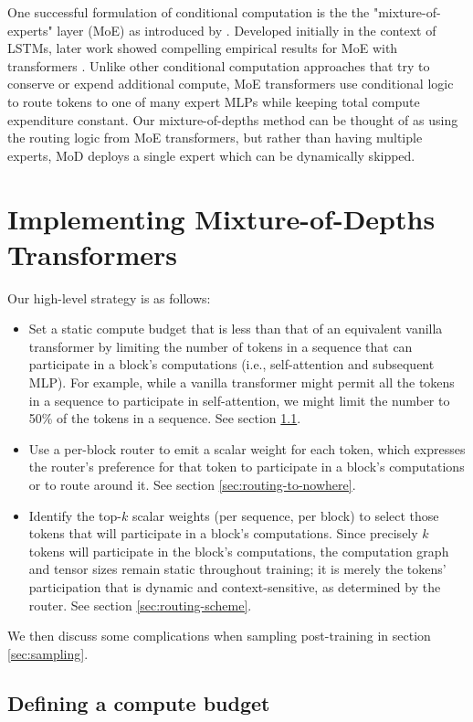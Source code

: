 \documentclass[11pt, a4paper, onecolumn, logo, copyright]{googledeepmind}
\begin{document}
One successful formulation of conditional computation is the the "mixture-of-experts" layer (MoE) as introduced by \citet{shazeer2017outrageously}. Developed initially in the context of LSTMs, later work showed compelling empirical results for MoE with transformers \citep{lepikhin2020gshard, fedus2022switch, zoph2022stmoe}. Unlike other conditional computation approaches that try to conserve or expend additional compute, MoE transformers use conditional logic to route tokens to one of many expert MLPs while keeping total compute expenditure constant. Our mixture-of-depths method can be thought of as using the routing logic from MoE transformers, but rather than having multiple experts, MoD deploys a single expert which can be dynamically skipped. 

\section{Implementing Mixture-of-Depths Transformers}
Our high-level strategy is as follows:
\begin{itemize}
    \item Set a static compute budget that is less than that of an equivalent vanilla transformer by limiting the number of tokens in a sequence that can participate in a block's computations (i.e., self-attention and subsequent MLP). For example, while a vanilla transformer might permit all the tokens in a sequence to participate in self-attention, we might limit the number to 50\% of the tokens in a sequence. See section \ref{sec:define-compute-budget}.
    \item Use a per-block router to emit a scalar weight for each token, which expresses the router's preference for that token to participate in a block's computations or to route around it. See section \ref{sec:routing-to-nowhere}.
    \item Identify the top-$k$ scalar weights (per sequence, per block) to select those tokens that will participate in a block's computations. Since precisely $k$ tokens will participate in the block's computations, the computation graph and tensor sizes remain static throughout training; it is merely the tokens' participation that is dynamic and context-sensitive, as determined by the router. See section \ref{sec:routing-scheme}.
\end{itemize}

We then discuss some complications when sampling post-training in section \ref{sec:sampling}.

\subsection{Defining a compute budget}
\label{sec:define-compute-budget}
\end{document}
